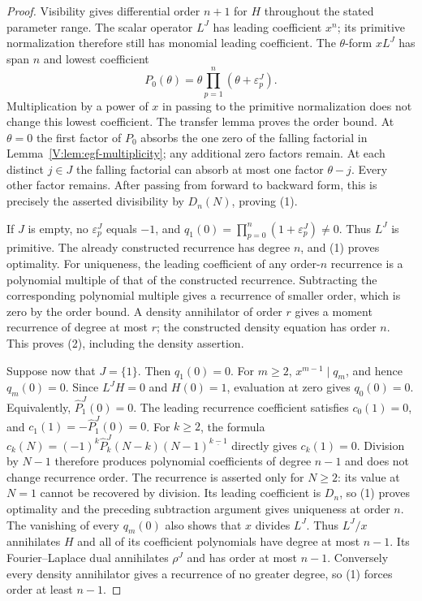 \documentclass[11pt,a4paper]{article}
\theoremstyle{definition}
\theoremstyle{remark}
\newcommand{\ff}[2]{#1^{\underline{#2}}}
\numberwithin{equation}{section}
\begin{document}
\begin{proof}
Visibility gives differential order $n+1$ for $H$ throughout the stated
parameter range. The scalar operator $L^J$ has leading coefficient $x^n$;
its primitive normalization therefore still has monomial leading
coefficient. The $\theta$-form $xL^J$ has span $n$ and lowest coefficient
\[
 P_0(\theta)=\theta\prod_{p=1}^n(\theta+\varepsilon^J_p).
\]
Multiplication by a power of $x$ in passing to the primitive normalization
does not change this lowest coefficient. The transfer lemma proves the
order bound. At $\theta=0$ the first factor of $P_0$ absorbs the one zero
of the falling factorial in Lemma~\ref{V:lem:egf-multiplicity}; any additional
zero factors remain. At each distinct $j\in J$ the falling factorial can
absorb at most one factor $\theta-j$. Every other factor remains.
After passing from forward to backward form, this is precisely the
asserted divisibility by $D_n(N)$, proving (1).

If $J$ is empty, no $\varepsilon^J_p$ equals $-1$, and
$q_1(0)=\prod_{p=0}^n(1+\varepsilon^J_p)\ne0$.
Thus $L^J$ is primitive. The already constructed recurrence has degree
$n$, and (1) proves optimality. For uniqueness, the leading coefficient
of any order-$n$ recurrence is a polynomial multiple of that of the
constructed recurrence. Subtracting the corresponding polynomial
multiple gives a recurrence of smaller order, which is zero by the
order bound. A density annihilator of order $r$ gives a moment recurrence
of degree at most $r$; the constructed density equation has order $n$.
This proves (2), including the density assertion.

Suppose now that $J=\{1\}$. Then $q_1(0)=0$. For $m\ge2$,
$x^{m-1}\mid q_m$, and hence $q_m(0)=0$. Since $L^JH=0$ and $H(0)=1$,
evaluation at zero gives $q_0(0)=0$. Equivalently,
$\hat P^J_1(0)=0$. The leading recurrence coefficient satisfies
$c_0(1)=0$, and $c_1(1)=-\hat P^J_1(0)=0$.
For $k\ge2$, the formula
$c_k(N)=(-1)^k\hat P^J_k(N-k)\ff{(N-1)}{k-1}$ directly gives
$c_k(1)=0$. Division by $N-1$ therefore produces polynomial
coefficients of degree $n-1$ and does not change recurrence order.
The recurrence is asserted only for $N\ge2$: its value at $N=1$
cannot be recovered by division. Its leading coefficient is $D_n$,
so (1) proves optimality and the preceding subtraction argument gives
uniqueness at order $n$.
The vanishing of every $q_m(0)$ also shows that $x$ divides $L^J$.
Thus $L^J/x$ annihilates $H$ and all of its coefficient polynomials
have degree at most $n-1$. Its Fourier--Laplace dual annihilates
$\rho^J$ and has order at most $n-1$. Conversely every density
annihilator gives a recurrence of no greater degree, so (1) forces
order at least $n-1$.
\end{proof}
\end{document}
